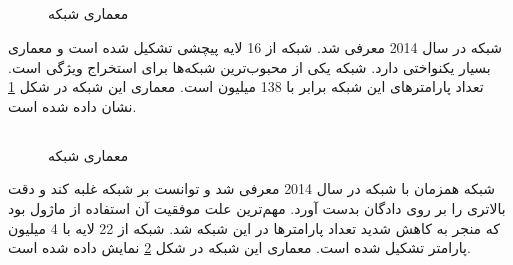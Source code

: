 \subsection{}
	\begin{figure}
		\caption[معماری شبکه ]{معماری شبکه 
			\cite{10CNN}}
		\label{fig:VGGNet}
	\end{figure}
	شبکه 
	\cite{simonyan2014very}
	در سال 2014 معرفی شد. شبکه
	 از 16 لایه پیچشی تشکیل شده است و معماری بسیار یکنواختی دارد. شبکه
	 یکی از محبوب‌ترین شبکه‌ها برای استخراج ویژگی است. تعداد پارامترهای این شبکه برابر با 138 میلیون است.  معماری این شبکه در شکل 
	 \ref{fig:VGGNet}
	 نشان داده شده است.
 
\subsection{}
	\begin{figure}
		\caption[معماری شبکه ]{معماری شبکه
			\cite{10CNN}}
		\label{fig:GoogleNet}
	\end{figure}
	شبکه
	\cite{szegedy2015going}
	همزمان با شبکه 
	در سال 2014 معرفی شد و  توانست بر شبکه
	غلبه کند و دقت بالاتری را بر روی دادگان
	بدست آورد. مهم‌ترین علت موفقیت آن استفاده از ماژول
	بود که منجر به کاهش شدید تعداد پارامترها در این شبکه شد. شبکه
	از 22 لایه با 4 میلیون پارامتر تشکیل شده است. معماری این شبکه در شکل 
	\ref{fig:GoogleNet}
	نمایش داده شده است.

